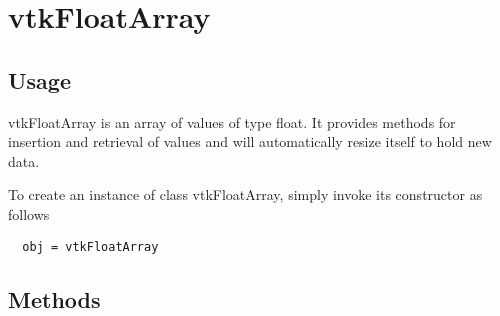 \section{vtkFloatArray}

\subsection{Usage}

 vtkFloatArray is an array of values of type float.  It provides
 methods for insertion and retrieval of values and will
 automatically resize itself to hold new data.

To create an instance of class vtkFloatArray, simply
invoke its constructor as follows
\begin{verbatim}
  obj = vtkFloatArray
\end{verbatim}
\subsection{Methods}

